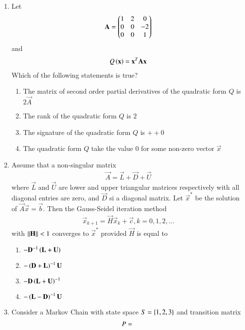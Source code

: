 \begin{enumerate}[label=\thesection.\arabic*.,ref=\thesection.\theenumi]
\begin{enumerate}
\end{enumerate}
%
\item Let
\begin{align}
\mathbf{A} =
\begin{pmatrix}
1 & 2 & 0 \\
0 & 0 & -2 \\
0 & 0 & 1
\end{pmatrix}
\end{align}
and 
\begin{align}
Q\left(\mathbf{x}\right) = \mathbf{x}^T\mathbf{A}\mathbf{x}
\end{align}
%
Which of the following statements is true?
\begin{enumerate}
\item The matrix of second order partial derivatives of the quadratic form $Q$ is $2\vec{A}$
\item The rank of the quadratic form $Q$ is $2$
\item The signature  of the quadratic form $Q$ is $++0$
\item The quadratic form $Q$ take the value 0 for some non-zero vector $\vec{x}$
\end{enumerate}
\solution

\item Assume that a non-singular matrix
\begin{align}
\vec{A} = \vec{L}+\vec{D}+\vec{U}
\end{align}
%
where $\vec{L}$ and $\vec{U}$ are lower and upper triangular matrices respectively with all
diagonal entries are zero, and $\vec{D}$ si a diagonal matrix.  Let $\vec{x}^{*}$ be the solution of
$\vec{A}\vec{x} = \vec{b}$.  Then the Gauss-Seidel iteration method 
\begin{align}
\vec{x}_{k+1} = \vec{H}\vec{x}_{k}+\vec{c}, k = 0,1,2,\dots
\end{align}
%
with $\left\lVert\mathbf{H}\right\rVert < 1$ converges to $\vec{x}^{*}$ provided $\vec{H}$ is equal to
\begin{enumerate}
\item $-\mathbf{D}^{-1}\left(\mathbf{L}+\mathbf{U}\right)$
\item $-\left(\mathbf{D}+\mathbf{L}\right)^{-1}\mathbf{U}$
\item $-\mathbf{D}\left(\mathbf{L}+\mathbf{U}\right)^{-1}$
\item $-\left(\mathbf{L}-\mathbf{D}\right)^{-1}\mathbf{U}$
\end{enumerate}
\item Consider a Markov Chain with state space $S = \left\{1,2, 3\right\}$ and transition matrix
\begin{align}
P = 
\begin{blockarray}{c@{\hspace{1pt}}rrr@{\hspace{3pt}}}

\end{blockarray}
\end{align}
\end{enumerate}
